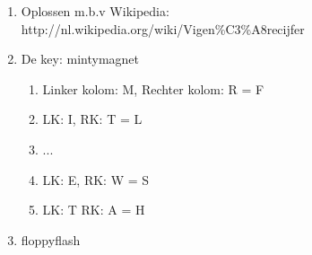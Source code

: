 \begin{enumerate}
  \item Oplossen m.b.v Wikipedia: http://nl.wikipedia.org/wiki/Vigen\%C3\%A8recijfer
  \item De key: mintymagnet
  \begin{enumerate}
  \item Linker kolom: M, Rechter kolom: R = F
  \item LK: I, RK: T = L
  \item ...
  \item LK: E, RK: W = S
  \item LK: T RK: A = H
  \end{enumerate}
  \item floppyflash
\end{enumerate}